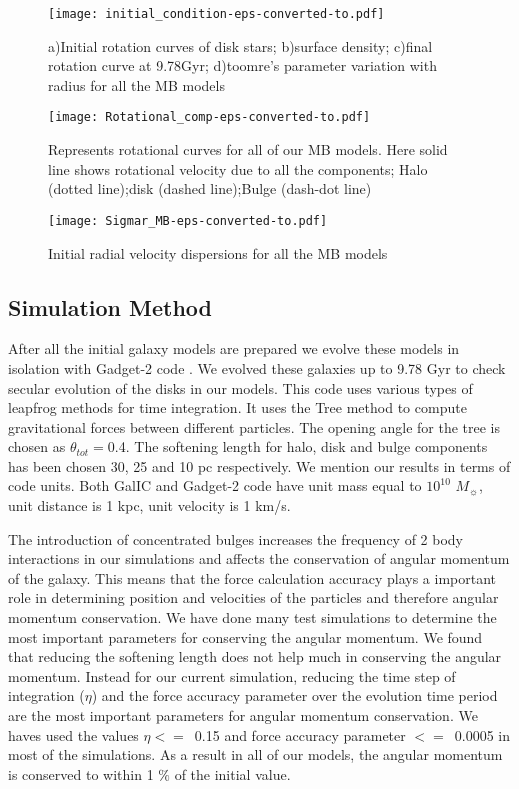 \documentclass[a4paper,fleqn,usenatbib,useAMS]{mnras}
\begin{document}
\begin{figure}
\texttt{[image: initial\_condition-eps-converted-to.pdf]}
\caption{a)Initial rotation curves of disk stars; b)surface density; c)final rotation curve at 9.78Gyr; d)toomre's parameter variation with radius for all the MB models}
\label{fig rot_MB}
\end{figure}

\begin{figure}
\texttt{[image: Rotational\_comp-eps-converted-to.pdf]}
\caption{Represents rotational curves for all of our MB models. Here solid line shows rotational velocity due to all the components; Halo (dotted line);disk (dashed line);Bulge (dash-dot line)}
\label{fig:rotcomp_MB}
\end{figure}

\begin{figure}
\texttt{[image: Sigmar\_MB-eps-converted-to.pdf]}
\caption{Initial radial velocity dispersions for all the MB models}
\label{fig sigma_MB}
\end{figure}


\subsection{Simulation Method}
After all the initial galaxy models are prepared we evolve these models in isolation with Gadget-2 code \citep{56}. We evolved these galaxies up to 9.78 Gyr to check secular evolution of the disks in our models. This code uses various types of leapfrog methods for time integration. It uses the Tree method \citep{56b} to compute gravitational forces between different particles. The opening angle for the tree is chosen as $\theta_{tot}=$0.4. The softening length for halo, disk and bulge components has been chosen 30, 25 and 10 pc respectively. We mention our results in terms of code units. Both GalIC and Gadget-2 code have unit mass equal to $10^{10}$  $M_{\sun}$, unit distance is 1 kpc, unit velocity is 1 km/s.


The introduction of concentrated bulges increases the frequency of 2 body interactions in our simulations and affects the conservation of angular momentum of the galaxy. This means that the force calculation accuracy plays a important role in determining position and velocities of the particles and therefore angular momentum conservation. We have done many test simulations to determine the most important parameters for conserving the angular momentum. We found that reducing the softening length does not help much in conserving the angular momentum.
Instead for our current simulation, reducing the time step of integration ($\eta$) and the force accuracy parameter over the evolution time period are the most important parameters for angular momentum conservation\citep{klypin2009}. We haves used the values $\eta< = $~0.15 and force accuracy parameter $< =$~0.0005 in most of the simulations. As a result in all of our models, the angular momentum is conserved to within 1 $\%$ of the initial value.
\end{document}
